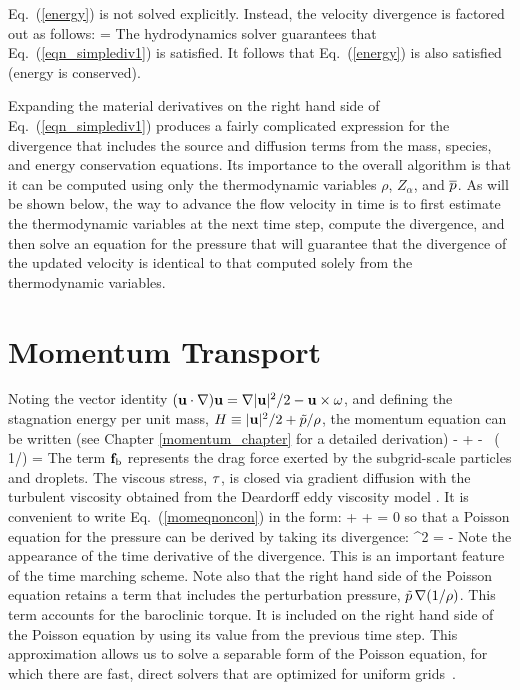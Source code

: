 Eq.~(\ref{energy}) is not solved explicitly. Instead, the velocity divergence is factored out as follows:
\be
\label{eqn_simplediv1}
\Div{} =  
\ee
The hydrodynamics solver guarantees that Eq.~(\ref{eqn_simplediv1}) is satisfied.  It follows that Eq.~(\ref{energy}) is also satisfied (energy is conserved).

Expanding the material derivatives on the right hand side of Eq.~(\ref{eqn_simplediv1}) produces a fairly complicated expression for
the divergence that includes the source and diffusion terms from the mass, species, and energy conservation equations. Its importance to the overall algorithm is that it can be computed using only the thermodynamic variables $\rho$, $Z_\alpha$, and $\overline{p}$. As will be shown below, the way to advance the flow velocity in time is to first estimate the thermodynamic variables at the next time step, compute the divergence, and then solve an equation for the pressure that will guarantee that the divergence of the updated velocity is identical to that computed solely from the thermodynamic variables.



\section{Momentum Transport}

Noting the vector identity $({\mathbf{u}} \cdot \nabla) {\mathbf{u}} = \nabla|{\mathbf{u}}|^2/2 - {\mathbf{u}}\times{\mathbf{\omega}} $, and defining the stagnation energy per unit mass, $H \equiv |{\mathbf{u}}|^2/2 + \tilde{p}/\rho$, the momentum equation can be written (see Chapter \ref{momentum_chapter} for a detailed derivation)
\be
    - \bu\times\bo + \nabla \cH - \tp \, \nabla \left( 1/\rho\right) =   \label{momeqnoncon}
\ee
The term ${\mathbf{f}}_\text{b}$ represents the drag force exerted by the subgrid-scale particles and droplets. The viscous stress, $\mathbf{\tau}$, is closed via gradient diffusion with the turbulent viscosity obtained from the Deardorff eddy viscosity model \cite{Deardorff:1980,Pope:2000}. It is convenient to write Eq.~(\ref{momeqnoncon}) in the form:
\be
    + \bF + \nabla \cH  = 0
\ee
so that a Poisson equation for the pressure can be derived by taking its divergence:
\be
   \nabla^2 \cH = -    \label{simplephi2}
\ee
Note the appearance of the time derivative of the divergence. This is an important feature of the time marching scheme. Note also that the right hand side of the Poisson equation retains a term that includes the perturbation pressure, $\tilde{p} \, \nabla (1/\rho)$. This term accounts for the baroclinic torque. It is included on the right hand side of the Poisson equation by using its value from the previous time step. This approximation allows us to solve a separable form of the Poisson equation, for which there are fast, direct solvers that are optimized for uniform grids~\cite{Sweet:1}.

